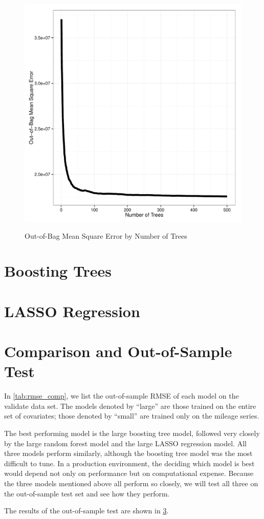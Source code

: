 \documentclass[11pt, fleqn]{article}
\begin{document}
\begin{figure}[!htb]
  \centering
  \caption{Out-of-Bag Mean Square Error by Number of Trees}
  \includegraphics[scale=.5]{rf_oob_mse.pdf}
  \label{fig:rf_oob_mse}
\end{figure}

\section{Boosting Trees}

\section{LASSO Regression}

\section{Comparison and Out-of-Sample Test}

In \cref{tab:rmse_comp}, we list the out-of-sample RMSE of each model on the validate data set. The models denoted by ``large'' are those trained on the entire set of covariates; those denoted by ``small'' are trained only on the mileage series.

The best performing model is the large boosting tree model, followed very closely by the large random forest model and the large LASSO regression model. All three models perform similarly, although the boosting tree model was the most difficult to tune. In a production environment, the deciding which model is best would depend not only on performance but on computational expense. Because the three models mentioned above all perform so closely, we will test all three on the out-of-sample test set and see how they perform.

The results of the out-of-sample test are shown in \cref{}.


\end{document}
